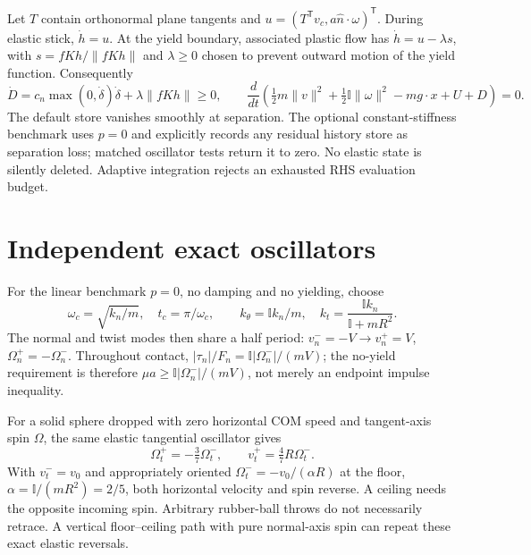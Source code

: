 \documentclass[10pt]{article}
\begin{document}
Let $T$ contain orthonormal plane tangents and $u=(T^\mathsf Tv_c,a\hat n\cdot\omega)^\mathsf T$. During elastic stick, $\dot h=u$. At the yield boundary, associated plastic flow has $\dot h=u-\lambda s$, with $s=fKh/\lVert fKh\rVert$ and $\lambda\geq0$ chosen to prevent outward motion of the yield function. Consequently
\[
\dot D=c_n\max(0,\dot\delta)\dot\delta+\lambda\lVert fKh\rVert\geq0,\qquad
\frac{d}{dt}\left(\tfrac12m\lVert v\rVert^2+\tfrac12\mathbb I\lVert\omega\rVert^2-mg\cdot x+U+D\right)=0.
\]
The default store vanishes smoothly at separation. The optional constant-stiffness benchmark uses $p=0$ and explicitly records any residual history store as separation loss; matched oscillator tests return it to zero. No elastic state is silently deleted. Adaptive integration rejects an exhausted RHS evaluation budget.
\section*{Independent exact oscillators}
For the linear benchmark $p=0$, no damping and no yielding, choose
\[
\omega_c=\sqrt{k_n/m},\quad t_c=\pi/\omega_c,\qquad
k_\theta=\mathbb I k_n/m,\quad k_t=\frac{\mathbb I k_n}{\mathbb I+mR^2}.
\]
The normal and twist modes then share a half period: $v_n^-=-V\to v_n^+=V$, $\Omega_n^+=-\Omega_n^-$. Throughout contact, $|\tau_n|/F_n=\mathbb I|\Omega_n^-|/(mV)$; the no-yield requirement is therefore $\mu a\geq\mathbb I|\Omega_n^-|/(mV)$, not merely an endpoint impulse inequality.

For a solid sphere dropped with zero horizontal COM speed and tangent-axis spin $\Omega$, the same elastic tangential oscillator gives
\[
\Omega_t^+=-\tfrac37\Omega_t^-,\qquad v_t^+=\tfrac47R\Omega_t^-.
\]
With $v_t^-=v_0$ and appropriately oriented $\Omega_t^-=-v_0/(\alpha R)$ at the floor, $\alpha=\mathbb I/(mR^2)=2/5$, both horizontal velocity and spin reverse. A ceiling needs the opposite incoming spin. Arbitrary rubber-ball throws do not necessarily retrace. A vertical floor--ceiling path with pure normal-axis spin can repeat these exact elastic reversals.
\newpage
\end{document}

